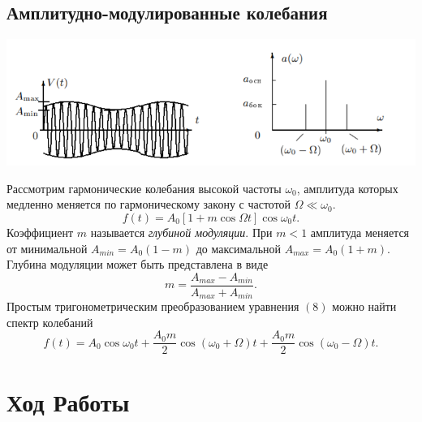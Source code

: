 \documentclass[a4paper,12pt]{article} %
\begin{document}
\subsection{Амплитудно-модулированные колебания}
\begin{center}
\includegraphics[scale=0.9]{4.png}
\end{center}
Рассмотрим гармонические колебания высокой частоты $\omega_0$, амплитуда которых медленно меняется по гармоническому закону с частотой $\Omega \ll \omega_0$.
\begin{equation}
f(t) = A_0 \left[1+m\cos \Omega t\right] \cos \omega_0 t.
\end{equation}
Коэффициент $m$ называется \textit{глубиной модуляции}. При $m < 1$ амплитуда меняется от минимальной $A_{min} = A_0(1-m)$ до максимальной $A_{max} = A_0(1+m)$. Глубина модуляции может быть представлена в виде
\begin{equation}
m = \dfrac{A_{max}-A_{min}}{A_{max}+A_{min}}.
\end{equation}
Простым тригонометрическим преобразованием уравнения $(8)$ можно найти спектр колебаний
\begin{equation}
f(t) = A_0 \cos \omega_0t + \dfrac{A_0m}{2} \cos \left(\omega_0 + \Omega\right)t + \dfrac{A_0m}{2}\cos\left(\omega_0 - \Omega\right)t.
\end{equation}

\section{Ход Работы}
\end{document}
